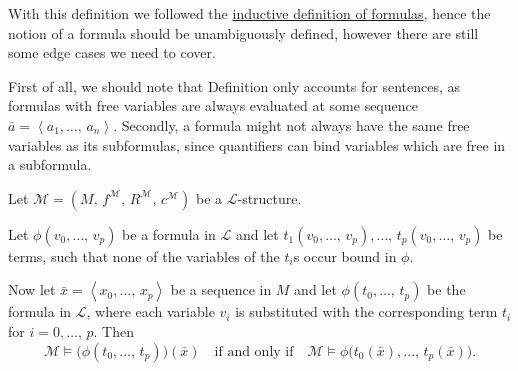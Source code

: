 \documentclass[../../main.tex]{subfiles}
\begin{document}
With this definition we followed the \hyperref[formula-def]{inductive definition of formulas},
hence the notion of a formula should be unambiguously defined, however there are still some edge cases we need to cover.

First of all, we should note that Definition \label{model-satisfaction-def} only accounts for sentences,
as formulas with free variables are always evaluated at some sequence $\bar{a} = \left<a_1,\ldots,\, a_n\right>$.
Secondly, a formula might not always have the same free variables as its subformulas, since quantifiers can bind variables which are free in a subformula.


%

\begin{theorem}\cite[Proposition 1.3.16]{Cha90}
    Let $\mathcal{M} = \left(M,\, f^{\mathcal{M}},\, R^{\mathcal{M}},\, c^{\mathcal{M}}\right)$ be a $\mathcal{L}$-structure.

    Let $\phi(v_0,\ldots,\, v_p)$ be a formula in $\mathcal{L}$ and let $t_1(v_0,\ldots,\, v_p),\ldots,\, t_p(v_0,\ldots,\, v_p)$ be terms, 
    such that none of the variables of the $t_i$s occur bound in $\phi$.

    Now let $\bar{x} = \left<x_0,\ldots,\, x_p\right>$ be a sequence in $M$ and let $\phi(t_0,\ldots,\, t_p)$ be the formula in $\mathcal{L}$,
    where each variable $v_i$ is substituted with the corresponding term $t_i$ for $i = 0,\ldots,\, p$.
    Then $$\mathcal{M} \models \big(\phi(t_0,\ldots,\, t_p)\big)(\bar{x}) \quad \text{if and only if} \quad \mathcal{M} \models  \phi\big(t_0(\bar{x}) ,\ldots,\, t_p(\bar{x})\big).$$
\end{theorem}
\end{document}

